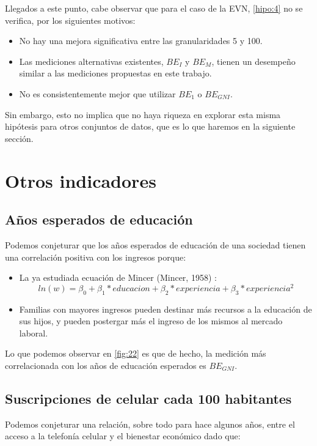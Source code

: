 Llegados a este punto, cabe observar que para el caso de la EVN, \ref{hipo:4} no se verifica, por los siguientes motivos:

\begin{itemize}
    \item No hay una mejora significativa entre las granularidades 5 y 100.
    \item Las mediciones alternativas existentes, $BE_I$ y $BE_M$, tienen un desempeño similar a las mediciones propuestas en este trabajo.
    \item No es consistentemente mejor que utilizar $BE_1$ o $BE_{GNI}$.
\end{itemize}

Sin embargo, esto no implica que no haya riqueza en explorar esta misma hipótesis para otros conjuntos de datos, que es lo que haremos en la siguiente sección.

\section{Otros indicadores}

\subsection{Años esperados de educación}

Podemos conjeturar que los años esperados de educación de una sociedad tienen una correlación positiva con los ingresos porque:

\begin{itemize}
    \item La ya estudiada ecuación de Mincer (Mincer, 1958) \cite{mincer1958investment}: $$ ln(w) = \beta_0 + \beta_1 * educacion + \beta_2 * experiencia + \beta_3 * experiencia^2$$
    \item Familias con mayores ingresos pueden destinar más recursos a la educación de sus hijos, y pueden postergar más el ingreso de los mismos al mercado laboral.  
\end{itemize}

Lo que podemos observar en \ref{fig:22} es que de hecho, la medición más correlacionada con los años de educación esperados es $BE_{GNI}$. 

\subsection{Suscripciones de celular cada 100 habitantes}

Podemos conjeturar una relación, sobre todo para hace algunos años, entre el acceso a la telefonía celular y el bienestar económico dado que:

